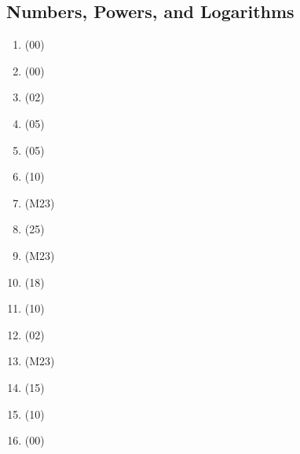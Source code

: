 \documentclass[Main.tex]{subfiles}
\begin{document}
\subsection{Numbers, Powers, and Logarithms}
\begin{enumerate}
    \item (00)
    
        
    
    \item (00)
    
        
    
    \item (02)
    
        
    
    \item (05)
    
        
    
    \item (05)
    
        
    
    \item (10)
    
        
    
    \item (M23)
    
        
    
    \item (25)
    
        
    
    \item (M23)
    
        
    
    \item (18)
    
        
    
    \item (10)
    
        
    
    \item (02)
    
        
    
    \item (M23)
    
        
    
    \item (15)
    
        
    
    \item (10)
    
        
    
    \item (00)
    

\end{enumerate}
\end{document}
